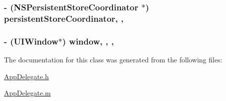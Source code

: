 \subsubsection[{persistent\+Store\+Coordinator}]{\setlength{\rightskip}{0pt plus 5cm}-\/ (N\+S\+Persistent\+Store\+Coordinator $\ast$) persistent\+Store\+Coordinator\hspace{0.3cm}{\ttfamily [read]}, {\ttfamily [nonatomic]}, {\ttfamily [strong]}}\label{interface_app_delegate_a4169fdb1085cc13479280e10d44c039a}
\hypertarget{interface_app_delegate_acf48ac24125e688cac1a85445cd7fac2}{}
\subsubsection[{window}]{\setlength{\rightskip}{0pt plus 5cm}-\/ (U\+I\+Window$\ast$) window\hspace{0.3cm}{\ttfamily [read]}, {\ttfamily [write]}, {\ttfamily [nonatomic]}, {\ttfamily [strong]}}\label{interface_app_delegate_acf48ac24125e688cac1a85445cd7fac2}


The documentation for this class was generated from the following files\+:\begin{DoxyCompactItemize}
\item 
\hyperlink{_app_delegate_8h}{App\+Delegate.\+h}\item 
\hyperlink{_app_delegate_8m}{App\+Delegate.\+m}\end{DoxyCompactItemize}
